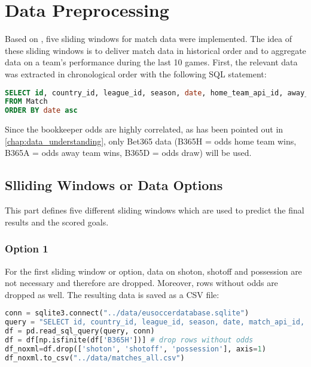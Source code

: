 
\chapter{Data Preprocessing}

Based on \cite{football-predictor}, five sliding windows for match data were implemented. The idea of these sliding windows is to deliver match data in historical order and to aggregate data on a team's performance during the last 10 games.
First, the relevant data was extracted in chronological order with the following SQL statement:

\begin{lstlisting}[language=SQL, caption=SQL code for Sliding Window]
SELECT id, country_id, league_id, season, date, home_team_api_id, away_team_api_id, home_team_goal, away_team_goal, B365H, B365D, B365A, shoton, shotoff, possession
FROM Match
ORDER BY date asc
\end{lstlisting}

Since the bookkeeper odds are highly correlated, as has been pointed out in \autoref{chap:data_understanding}, only Bet365 data (B365H = odds home team wins, B365A = odds away team wins, B365D = odds draw) will be used.


\section {Slliding Windows or Data Options}
This part defines five different sliding windows which are used to predict the final results and the scored goals.
\subsection {Option 1}
For the first sliding window or option, data on shoton, shotoff and possession are not necessary and therefore are dropped. Moreover, rows without odds are dropped as well. The resulting data is saved as a CSV file:


\begin{lstlisting}[language=Python, caption=Python code for matches\_all.csv]
conn = sqlite3.connect("../data/eusoccerdatabase.sqlite")
query = "SELECT id, country_id, league_id, season, date, match_api_id, home_team_api_id, away_team_api_id, home_team_goal, away_team_goal, B365H, B365D, B365A, shoton, shotoff, possession FROM Match ORDER BY date asc"
df = pd.read_sql_query(query, conn)
df = df[np.isfinite(df['B365H'])] # drop rows without odds
df_noxml=df.drop(['shoton', 'shotoff', 'possession'], axis=1)
df_noxml.to_csv("../data/matches_all.csv")
\end{lstlisting}

